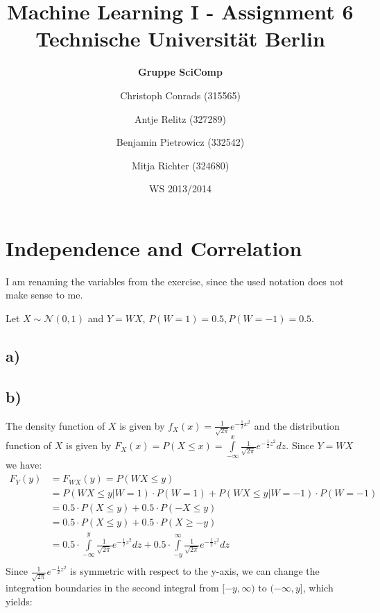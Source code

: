 \documentclass[paper=a4,fontsize=10pt,DIV11,BCOR10mm]{scrartcl}
\begin{document}
\title{Machine Learning I - Assignment 6\\
\small{Technische Universität Berlin}}


\author{\hspace{5cm}\textbf{Gruppe SciComp}\hspace{5cm} \and
	\small{Christoph Conrads (315565)} \and
	\small{Antje Relitz (327289)} \and
	\small{Benjamin Pietrowicz (332542)} \and
	\small{Mitja Richter (324680)}
}

\date{WS 2013/2014}

\maketitle


\section{Independence and Correlation}

I am renaming the variables from the exercise, since the used notation does not make sense to me. 

Let $X\sim\mathcal{N}(0,1)$ and $Y=WX$, $P(W=1)=0.5, P(W=-1)=0.5$.
 
\subsection*{a)}



\subsection*{b)}
The density function of $X$ is given by $f_X(x)=\frac{1}{\sqrt{2 \pi}} e^{-\frac{1}{2}x^2}$ and the distribution function of $X$ is given by $F_X(x)=P(X\leq x)=\int\limits_{-\infty}^{x} \frac{1}{\sqrt{2 \pi}} e^{-\frac{1}{2}z^2}dz$.
Since $Y=WX$ we have:
\begin{align*}
F_Y(y)&=F_{WX}(y)=P(WX\leq y)\\
&= P(WX\leq y|W=1)\cdot P(W=1)+P(WX\leq y|W=-1)\cdot P(W=-1)\\
&= 0.5 \cdot P(X\leq y)+ 0.5 \cdot P(-X\leq y)\\
&= 0.5 \cdot P(X\leq y)+ 0.5 \cdot P(X \geq -y)\\
&= 0.5 \cdot \int\limits_{-\infty}^{y} \frac{1}{\sqrt{2 \pi}} e^{-\frac{1}{2}z^2}dz+ 0.5 \cdot \int\limits_{-y}^{\infty} \frac{1}{\sqrt{2 \pi}} e^{-\frac{1}{2}z^2}dz\\
\end{align*}
Since $\frac{1}{\sqrt{2 \pi}} e^{-\frac{1}{2}z^2}$ is symmetric with respect to the y-axis, we can change the integration boundaries in the second integral from $[-y,\infty)$ to $(-\infty,y]$, which yields:
\end{document}
